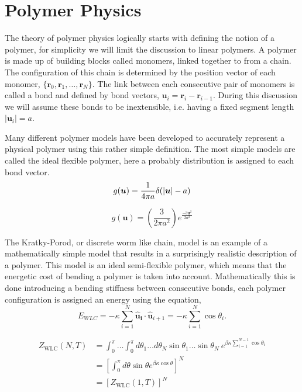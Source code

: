 \section{Polymer Physics}
The theory of polymer physics logically starts with defining the notion of a polymer, for
simplicity we will limit the discussion to linear polymers. A
polymer is made up of building blocks called monomers, linked together to from a chain.
The configuration of this chain is determined by the position vector of each monomer,
$\{\boldsymbol{r}_0, \boldsymbol{r}_1, \dots, \boldsymbol{r}_N\}$. The link between each
consecutive pair of monomers is called a bond and defined by bond vectors,
$\boldsymbol{u}_i = \boldsymbol{r}_i - \boldsymbol{r}_{i-1}$. During this discussion we
will assume these bonds to be inextensible, i.e. having a fixed
segment length $|\boldsymbol{u}_i| = a$.

Many different polymer models have been developed to accurately represent a physical
polymer using this rather simple definition. The most simple models are called the ideal
flexible polymer, here a probably distribution is assigned to each bond vector.
\begin{equation}
    g(\boldsymbol{u}) = \frac{1}{4 \pi a}
    \delta(|\boldsymbol{u}| - a)\\
\end{equation}


\begin{equation}
    g(\boldsymbol{u}) = (\frac{3}{2 \pi a^2}) e^{\frac{-3
    \boldsymbol{u}^2}{2 a^2}}
\end{equation}

The Kratky-Porod, or discrete worm like chain, model is an example of a mathematically
simple model that results in a surprisingly realistic description of a polymer. This
model is an ideal semi-flexible polymer, which means that the energetic cost of bending a
polymer is taken into account. Mathematically this is done introducing a bending
stiffness between consecutive bonds, each polymer configuration is assigned an energy
using the equation,
\begin{equation}
    E_{WLC}= -\kappa \sum_{i=1}^{N} \boldsymbol{\hat{u}_i} \cdot
    \boldsymbol{\hat{u}}_{i+1}
    = -\kappa
    \sum_{i=1}^{N} \cos\theta_i.
\end{equation}

\begin{equation}
\begin{aligned}
    \label{210}
    Z_{\mathrm{WLC}}(N, T)
    &= \int_{0}^{\pi}\dots \int_{0}^{\pi} d \theta_1 \dots d \theta_N \sin \theta_1 \dots
    \sin \theta_N\ e^{\beta \kappa \sum_{i=1}^{N-1} \cos\theta_i}\\
    &= \left[\int_{0}^{\pi} d \theta \sin \theta e^{\beta \kappa \cos
    \theta}\right]^{N}\\
    &= \left[Z_{\mathrm{WLC}}(1, T)\right]^{N}
\end{aligned}
\end{equation}

